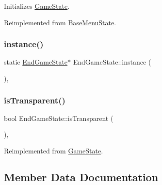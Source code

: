 Initializes \mbox{\hyperlink{class_game_state}{Game\+State}}. 



Reimplemented from \mbox{\hyperlink{class_base_menu_state_ae29d522c56a4582ce79e113426421741}{Base\+Menu\+State}}.

\mbox{\label{class_end_game_state_acf46076d50ef1a957b0e42a4c7668578}} 
\subsubsection{\texorpdfstring{instance()}{instance()}}
{\footnotesize\ttfamily static \mbox{\hyperlink{class_end_game_state}{End\+Game\+State}}$\ast$ End\+Game\+State\+::instance (\begin{DoxyParamCaption}{ }\end{DoxyParamCaption})\hspace{0.3cm}{\ttfamily [inline]}, {\ttfamily [static]}}

\mbox{\label{class_end_game_state_a0cafb4ddc794cdbde37e1624ef02bbf9}} 
\subsubsection{\texorpdfstring{isTransparent()}{isTransparent()}}
{\footnotesize\ttfamily bool End\+Game\+State\+::is\+Transparent (\begin{DoxyParamCaption}{ }\end{DoxyParamCaption})\hspace{0.3cm}{\ttfamily [inline]}, {\ttfamily [virtual]}}



Reimplemented from \mbox{\hyperlink{class_game_state_af75d6db30190901ed70704d18804fac7}{Game\+State}}.



\subsection{Member Data Documentation}
\mbox{\label{class_end_game_state_a987fea680922932c1ae2de74d859649d}} 
